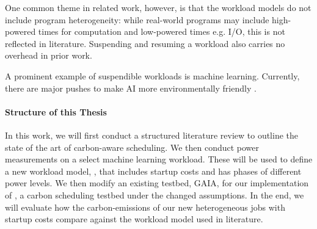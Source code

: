 One common theme in related work, however, is that the workload models do not include program heterogeneity: while real-world programs may include high-powered times for computation and low-powered times e.g. I/O, this is not reflected in literature. 
Suspending and resuming a workload also carries no overhead in prior work. 

A prominent example of suspendible workloads is machine learning. Currently, there are major pushes to make AI more environmentally friendly \cite{schwartz_green_2019}. 

\paragraph{Structure of this Thesis}

In this work, we will first conduct a structured literature review to outline the state of the art of carbon-aware scheduling. 
We then conduct power measurements on a select machine learning workload.
These will be used to define a new workload model, \modelname{}, that includes startup costs and has phases of different power levels. 
We then modify an existing testbed, GAIA, for our implementation of \programname{}, a carbon scheduling testbed under the changed assumptions.
In the end, we will evaluate how the carbon-emissions of our new heterogeneous jobs with startup costs compare against the workload model used in literature.
